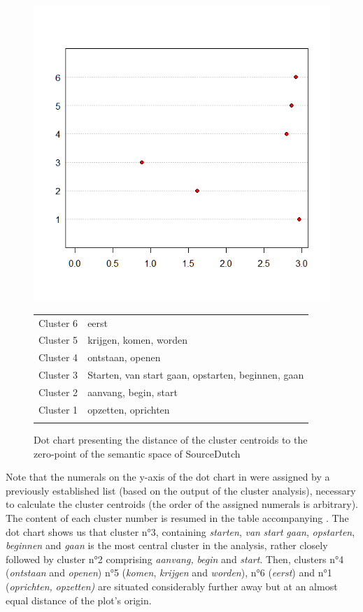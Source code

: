 \begin{figure} 
\includegraphics[height=.4\textheight]{figures/Vandevoorde2-img55.png}
\scriptsize
\begin{tabular}{ll}
\lsptoprule
Cluster 6 & eerst\\
Cluster 5 & krijgen, komen, worden\\
Cluster 4 & ontstaan, openen\\
Cluster 3 & Starten, van start gaan, opstarten, beginnen, gaan\\
Cluster 2 & aanvang, begin, start\\
Cluster 1 & opzetten, oprichten\\
\lspbottomrule
\end{tabular}
\normalsize
\caption{\label{fig:4:55}  Dot chart presenting the distance of the cluster centroids to the zero-point of the semantic space of SourceDutch}
\end{figure}

Note that the numerals on the y-axis of the dot chart in  were assigned by a previously established list (based on the output of the cluster analysis), necessary to calculate the cluster centroids (the order of the assigned numerals is arbitrary). The content of each cluster number is resumed in the table accompanying . The dot chart shows us that cluster n°3, containing \textit{starten}, \textit{van} \textit{start} \textit{gaan}, \textit{opstarten}, \textit{beginnen} and \textit{gaan} is the most central cluster in the analysis, rather closely followed by cluster n°2 comprising \textit{aanvang,} \textit{begin} and \textit{start}. Then, clusters n°4 (\textit{ontstaan} and \textit{openen}) n°5 (\textit{komen}, \textit{krijgen} and \textit{worden}), n°6 (\textit{eerst}) and n°1 (\textit{oprichten,} \textit{opzetten)} are situated considerably further away but at an almost equal distance of the plot’s origin.

